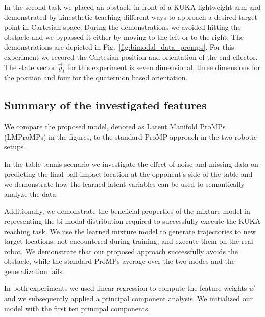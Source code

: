 In the second task we placed an obstacle in front of a KUKA lightweight arm and 
demonstrated by kinesthetic teaching different ways to approach a desired
target point in Cartesian space. During the demonstrations we avoided hitting
the obstacle and we bypassed it either by moving to the left or to the right. The
demonstrations are depicted in Fig.~\ref{fig:bimodal_data_promps}. For this
experiment we recored the Cartesian position and orientation of the
end-effector. The state vector $\vec y_t$ for this experiment is seven
dimensional, three dimensions for the position and four for the quaternion based
orientation. 

\subsection{Summary of the investigated features}

We compare the proposed model, denoted as Latent Manifold ProMPs (LMProMPs) in the figures, 
to the standard ProMP approach in the two robotic setups. 

In the table tennis
scenario we investigate the effect of noise and missing data on predicting the
final ball impact location at the opponent's side of the table and we
demonstrate how the learned latent variables can be used to semantically analyze 
the data. 

Additionally, we demonstrate the beneficial properties of the mixture model
in representing the bi-modal distribution 
required to successfully execute the KUKA reaching task. We use the learned mixture model 
to generate trajectories to new target locations, not encountered during training, and execute
them on the real robot. We demonstrate that our proposed approach
successfully avoids the obstacle, while the standard ProMPs average over the two
modes and the generalization fails.


In both experiments we used linear regression to compute the feature weights
$\vec w$ and we subsequently applied a principal component analysis. We
initialized our model with the first ten principal components.






